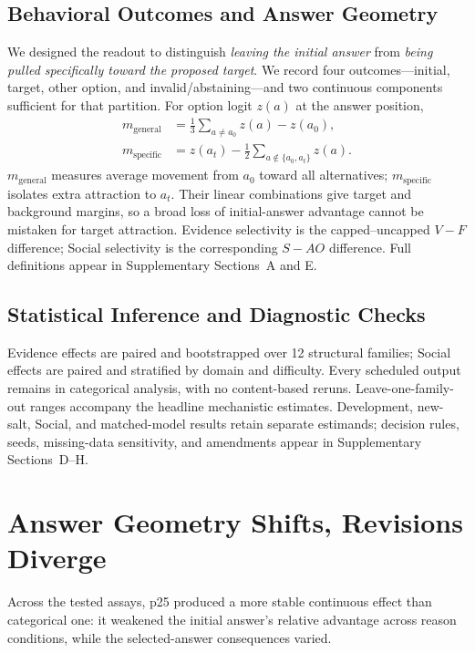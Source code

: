 \documentclass[letterpaper]{article} %
\begin{document}
\subsection{Behavioral Outcomes and Answer Geometry}
\label{sec:cedar-readouts}

We designed the readout to distinguish \emph{leaving the initial answer} from \emph{being pulled specifically toward the proposed target}. We record four outcomes---initial, target, other option, and invalid/abstaining---and two continuous components sufficient for that partition. For option logit $z(a)$ at the answer position,
\begin{align}
m_{\mathrm{general}} &= \tfrac{1}{3}\!\sum_{a\neq a_0}z(a)-z(a_0),\nonumber\\
m_{\mathrm{specific}} &= z(a_t)-\tfrac{1}{2}\!\sum_{a\notin\{a_0,a_t\}}z(a).
\label{eq:margins}
\end{align}
$m_{\mathrm{general}}$ measures average movement from $a_0$ toward all alternatives; $m_{\mathrm{specific}}$ isolates extra attraction to $a_t$. Their linear combinations give target and background margins, so a broad loss of initial-answer advantage cannot be mistaken for target attraction. Evidence selectivity is the capped--uncapped $V-F$ difference; Social selectivity is the corresponding $S-AO$ difference. Full definitions appear in Supplementary Sections~A and E.

\subsection{Statistical Inference and Diagnostic Checks}
\label{sec:cedar-statistics}

Evidence effects are paired and bootstrapped over 12 structural families; Social effects are paired and stratified by domain and difficulty. Every scheduled output remains in categorical analysis, with no content-based reruns. Leave-one-family-out ranges accompany the headline mechanistic estimates. Development, new-salt, Social, and matched-model results retain separate estimands; decision rules, seeds, missing-data sensitivity, and amendments appear in Supplementary Sections~D--H.

\section{Answer Geometry Shifts, Revisions Diverge}
\label{sec:behavior}

Across the tested assays, p25 produced a more stable continuous effect than categorical one: it weakened the initial answer's relative advantage across reason conditions, while the selected-answer consequences varied.
\end{document}

